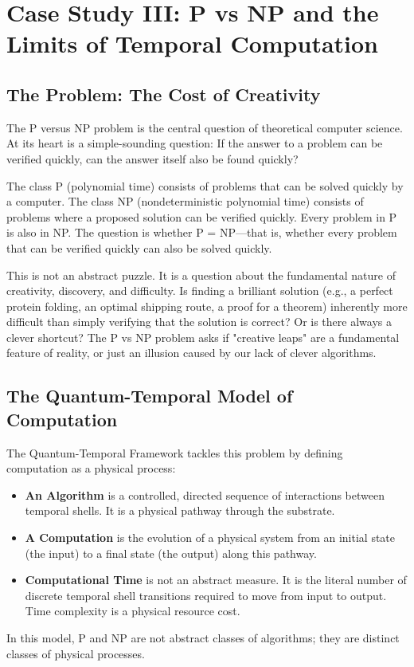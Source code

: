 \documentclass[12pt]{report}
\begin{document}
\chapter{Case Study III: P vs NP and the Limits of Temporal Computation}

\section{The Problem: The Cost of Creativity}
The P versus NP problem is the central question of theoretical computer science. At its heart is a simple-sounding question: If the answer to a problem can be verified quickly, can the answer itself also be found quickly?

The class P (polynomial time) consists of problems that can be solved quickly by a computer. The class NP (nondeterministic polynomial time) consists of problems where a proposed solution can be verified quickly. Every problem in P is also in NP. The question is whether P = NP—that is, whether every problem that can be verified quickly can also be solved quickly.

This is not an abstract puzzle. It is a question about the fundamental nature of creativity, discovery, and difficulty. Is finding a brilliant solution (e.g., a perfect protein folding, an optimal shipping route, a proof for a theorem) inherently more difficult than simply verifying that the solution is correct? Or is there always a clever shortcut? The P vs NP problem asks if "creative leaps" are a fundamental feature of reality, or just an illusion caused by our lack of clever algorithms.

\section{The Quantum-Temporal Model of Computation}
The Quantum-Temporal Framework tackles this problem by defining computation as a physical process:
\begin{itemize}
    \item \textbf{An Algorithm} is a controlled, directed sequence of interactions between temporal shells. It is a physical pathway through the substrate.
    \item \textbf{A Computation} is the evolution of a physical system from an initial state (the input) to a final state (the output) along this pathway.
    \item \textbf{Computational Time} is not an abstract measure. It is the literal number of discrete temporal shell transitions required to move from input to output. Time complexity is a physical resource cost.
\end{itemize}
In this model, P and NP are not abstract classes of algorithms; they are distinct classes of physical processes.
\end{document}
